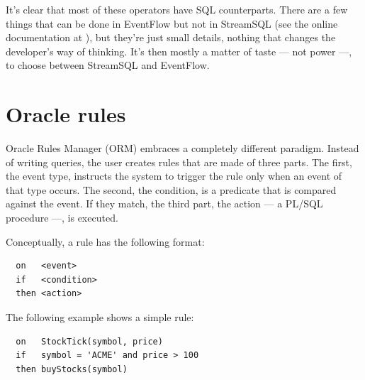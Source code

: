 \documentclass[a4,11pt]{report}
\begin{document}
It's clear that most of these operators have SQL counterparts. There
are a few things that can be done in EventFlow but not in StreamSQL
(see the online documentation at \cite{eventflow2streamsql}), but
they're just small details, nothing that changes the developer's way
of thinking. It's then mostly a matter of taste --- not power ---, to
choose between StreamSQL and EventFlow.

\section{Oracle rules}
\label{sec:orm}

Oracle Rules Manager (ORM) \cite{orm:www} embraces a completely
different paradigm. Instead of writing queries, the user creates rules
that are made of three parts. The first, the event type, instructs the
system to trigger the rule only when an event of that type occurs. The
second, the condition, is a predicate that is compared against the
event. If they match, the third part, the action --- a PL/SQL
procedure ---, is executed.

Conceptually, a rule has the following format:

\lstset{
  language=Oracle,
  columns=fullflexible,
  basicstyle=\tt,
  keywordstyle=\bf,
}


\begin{lstlisting}
  on   <event>
  if   <condition>
  then <action>
\end{lstlisting}

The following example shows a simple rule:

\begin{lstlisting}
  on   StockTick(symbol, price)
  if   symbol = 'ACME' and price > 100
  then buyStocks(symbol)
\end{lstlisting}
\end{document}
